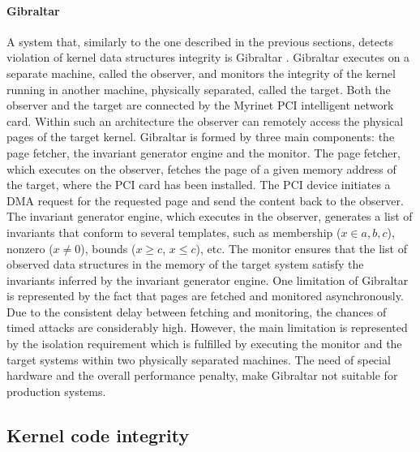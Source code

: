 
\paragraph{Gibraltar}
A system that, similarly to the one described in the previous sections, detects violation of kernel data structures integrity is Gibraltar \cite{6}. Gibraltar executes on a separate machine, called the observer, and monitors the integrity of the kernel running in another machine, physically separated, called the target. Both the observer and the target are connected by the Myrinet PCI intelligent network card. Within such an architecture the observer can remotely access the physical pages of the target kernel. Gibraltar is formed by three main components: the page fetcher, the invariant generator engine and the monitor. The page fetcher, which executes on the observer, fetches the page of a given memory address of the target, where the PCI card has been installed. The PCI device initiates a DMA request for the requested page and send the content back to the observer.
The invariant generator engine, which executes in the observer, generates a list of invariants that conform to several templates, such as membership ($x \in a,b,c$), nonzero ($x \neq 0$), bounds ($x \geq c$, $x \leq c$), etc. The monitor ensures that the list of observed data structures in the memory of the target system satisfy the invariants inferred by the invariant generator engine.
One limitation of Gibraltar is represented by the fact that pages are fetched and monitored asynchronously. Due to the consistent delay between fetching and monitoring, the chances of timed attacks are considerably high.
However, the main limitation is represented by the isolation requirement which is fulfilled by executing the monitor and the target systems within two physically separated machines. The need of special hardware and the overall performance penalty, make Gibraltar not suitable for production systems.  



\subsection{Kernel code integrity} \label{integrity}

